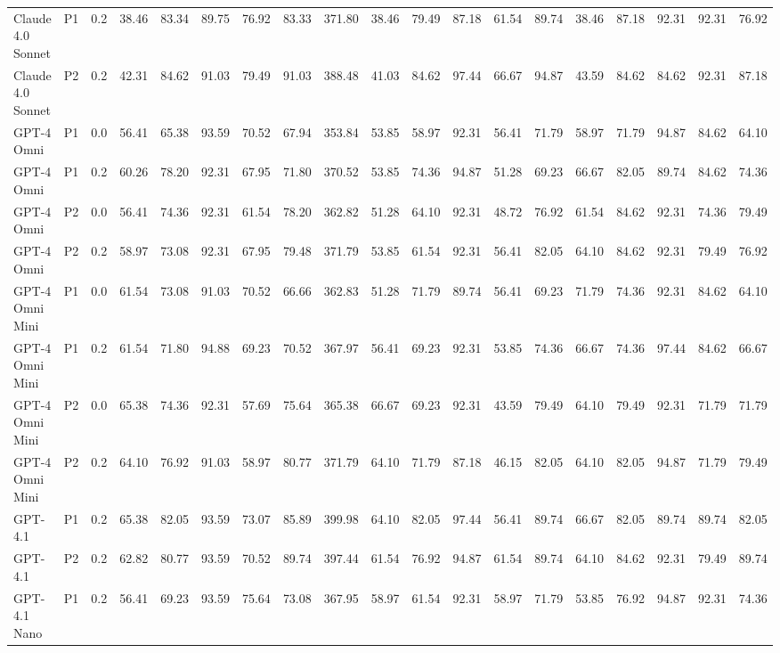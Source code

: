 \begin{landscape}
\begin{longtable}{|l|c|c|ccccc|c|ccccc|ccccc|}
        Claude 4.0 Sonnet & P1 & 0.2 & 38.46 & 83.34 & 89.75 & 76.92 & 83.33 & 371.80 & 38.46 & 79.49 & 87.18 & 61.54 & 89.74 & 38.46 & 87.18 & 92.31 & 92.31 & 76.92 \\
        Claude 4.0 Sonnet & P2 & 0.2 & 42.31 & 84.62 & 91.03 & 79.49 & 91.03 & 388.48 & 41.03 & 84.62 & 97.44 & 66.67 & 94.87 & 43.59 & 84.62 & 84.62 & 92.31 & 87.18 \\
        GPT-4 Omni & P1 & 0.0 & 56.41 & 65.38 & 93.59 & 70.52 & 67.94 & 353.84 & 53.85 & 58.97 & 92.31 & 56.41 & 71.79 & 58.97 & 71.79 & 94.87 & 84.62 & 64.10 \\
        GPT-4 Omni & P1 & 0.2 & 60.26 & 78.20 & 92.31 & 67.95 & 71.80 & 370.52 & 53.85 & 74.36 & 94.87 & 51.28 & 69.23 & 66.67 & 82.05 & 89.74 & 84.62 & 74.36 \\
        GPT-4 Omni & P2 & 0.0 & 56.41 & 74.36 & 92.31 & 61.54 & 78.20 & 362.82 & 51.28 & 64.10 & 92.31 & 48.72 & 76.92 & 61.54 & 84.62 & 92.31 & 74.36 & 79.49 \\
        GPT-4 Omni & P2 & 0.2 & 58.97 & 73.08 & 92.31 & 67.95 & 79.48 & 371.79 & 53.85 & 61.54 & 92.31 & 56.41 & 82.05 & 64.10 & 84.62 & 92.31 & 79.49 & 76.92 \\
        GPT-4 Omni Mini & P1 & 0.0 & 61.54 & 73.08 & 91.03 & 70.52 & 66.66 & 362.83 & 51.28 & 71.79 & 89.74 & 56.41 & 69.23 & 71.79 & 74.36 & 92.31 & 84.62 & 64.10 \\
        GPT-4 Omni Mini & P1 & 0.2 & 61.54 & 71.80 & 94.88 & 69.23 & 70.52 & 367.97 & 56.41 & 69.23 & 92.31 & 53.85 & 74.36 & 66.67 & 74.36 & 97.44 & 84.62 & 66.67 \\
        GPT-4 Omni Mini & P2 & 0.0 & 65.38 & 74.36 & 92.31 & 57.69 & 75.64 & 365.38 & 66.67 & 69.23 & 92.31 & 43.59 & 79.49 & 64.10 & 79.49 & 92.31 & 71.79 & 71.79 \\
        GPT-4 Omni Mini & P2 & 0.2 & 64.10 & 76.92 & 91.03 & 58.97 & 80.77 & 371.79 & 64.10 & 71.79 & 87.18 & 46.15 & 82.05 & 64.10 & 82.05 & 94.87 & 71.79 & 79.49 \\
        GPT-4.1 & P1 & 0.2 & 65.38 & 82.05 & 93.59 & 73.07 & 85.89 & 399.98 & 64.10 & 82.05 & 97.44 & 56.41 & 89.74 & 66.67 & 82.05 & 89.74 & 89.74 & 82.05 \\
        GPT-4.1 & P2 & 0.2 & 62.82 & 80.77 & 93.59 & 70.52 & 89.74 & 397.44 & 61.54 & 76.92 & 94.87 & 61.54 & 89.74 & 64.10 & 84.62 & 92.31 & 79.49 & 89.74 \\
        GPT-4.1 Nano & P1 & 0.2 & 56.41 & 69.23 & 93.59 & 75.64 & 73.08 & 367.95 & 58.97 & 61.54 & 92.31 & 58.97 & 71.79 & 53.85 & 76.92 & 94.87 & 92.31 & 74.36 \\

\end{longtable}
\end{landscape}
